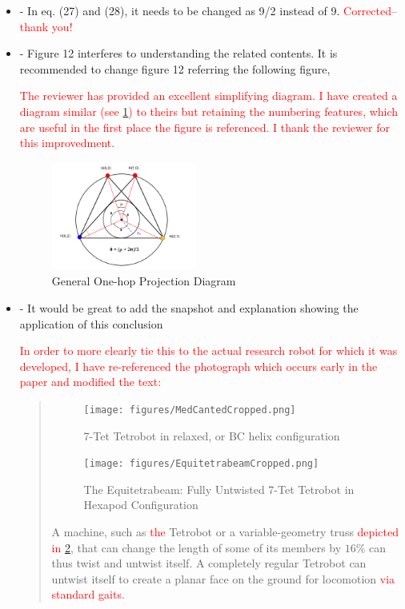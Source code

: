 \documentclass{article}
\newcommand{\highlighttext}[1] {\textcolor{red}{#1}}
\begin{document}
\begin{itemize}
\item
  - In eq. (27) and (28), it needs to be changed as 9/2 instead of 9.
  \highlighttext{Corrected--thank you!}  
  \item
- Figure 12 interferes to understanding the related contents. It is recommended to change
figure 12 referring the following figure,

\highlighttext{The reviewer has provided an excellent simplifying diagram. I have created a diagram similar
  (see \cref{fig:projectiondiagram})
  to theirs but retaining the numbering features, which are useful in the first place the
  figure is referenced. I thank the reviewer for this improvedment.}

\begin{figure}
     \centering
     \includegraphics[width=0.45\textwidth]{figures/GeneralProjectionDiagramV2.png}
     \caption{General One-hop Projection Diagram}
  \label{fig:projectiondiagram}
\end{figure}

\item
- It would be great to add the snapshot and explanation showing the application of this
conclusion

\highlighttext{In order to more clearly tie this to the actual research robot for which it was developed,
  I have re-referenced the photograph which occurs early in the paper and modified the text:}

\begin{quote}
  \begin{figure}
  \centering
     \texttt{[image: figures/MedCantedCropped.png]}
     \caption{7-Tet Tetrobot in relaxed, or BC helix configuration}
     \texttt{[image: figures/EquitetrabeamCropped.png]}
     \caption{The Equitetrabeam: Fully Untwisted 7-Tet Tetrobot in Hexapod Configuration}
     \label{fig:tetrobot}
\end{figure}

A machine, such as \highlighttext{the} Tetrobot or a variable-geometry truss \highlighttext{ depicted in \cref{fig:tetrobot}}, that can change
the length of some of its members by $16\%$ can thus twist and untwist itself.
A completely regular Tetrobot can untwist itself to create a planar
face on the ground for locomotion \highlighttext{via standard gaits}.
\end{quote}

\end{itemize}
\end{document}
